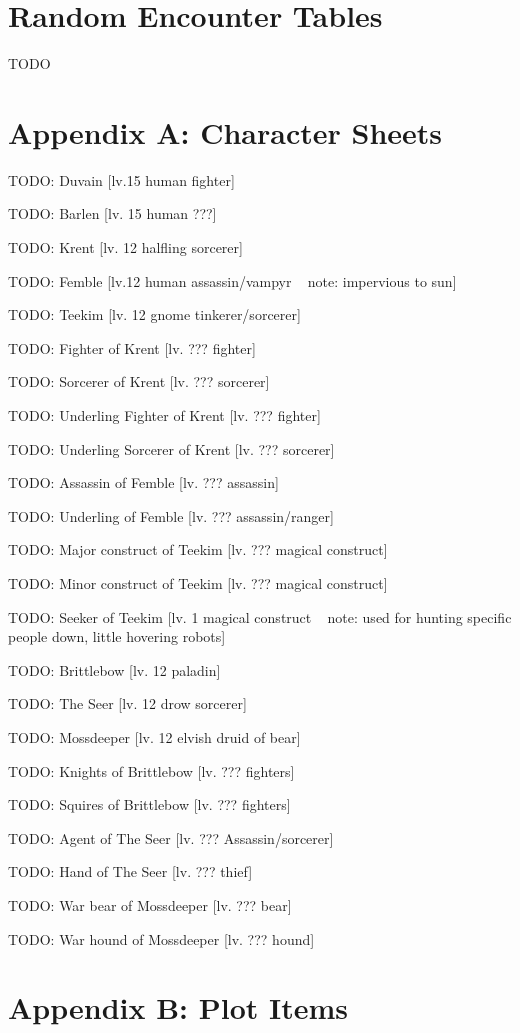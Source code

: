\documentclass[10pt,twoside,twocolumn]{article}
\begin{document}
\section{Random Encounter Tables}

TODO

\section{Appendix A: Character Sheets}
TODO: Duvain [lv.15 human fighter]

TODO: Barlen [lv. 15 human ???]

TODO: Krent [lv. 12 halfling sorcerer]

TODO: Femble [lv.12 human assassin/vampyr ~ note: impervious to sun]

TODO: Teekim [lv. 12 gnome tinkerer/sorcerer]

TODO: Fighter of Krent [lv. ??? fighter]

TODO: Sorcerer of Krent [lv. ??? sorcerer]

TODO: Underling Fighter of Krent [lv. ??? fighter]

TODO: Underling Sorcerer of Krent [lv. ??? sorcerer]

TODO: Assassin of Femble [lv. ??? assassin]

TODO: Underling of Femble [lv. ??? assassin/ranger]

TODO: Major construct of Teekim [lv. ??? magical construct]

TODO: Minor construct of Teekim [lv. ??? magical construct]

TODO: Seeker of Teekim [lv. 1 magical construct ~ note: used for hunting specific people down, little hovering robots]

TODO: Brittlebow [lv. 12 paladin]

TODO: The Seer [lv. 12 drow sorcerer]

TODO: Mossdeeper [lv. 12 elvish druid of bear]

TODO: Knights of Brittlebow [lv. ??? fighters]

TODO: Squires of Brittlebow [lv. ??? fighters]

TODO: Agent of The Seer [lv. ??? Assassin/sorcerer]

TODO: Hand of The Seer [lv. ??? thief]

TODO: War bear of Mossdeeper [lv. ??? bear]

TODO: War hound of Mossdeeper [lv. ??? hound]

\section{Appendix B: Plot Items}
\end{document}
